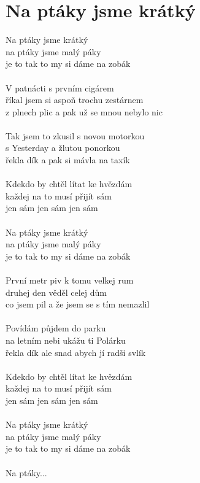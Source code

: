 \section{Na ptáky jsme krátký}
Na ptáky jsme krátký\\
na ptáky jsme malý páky\\
je to tak to my si dáme na zobák\\
\\
V patnácti s prvním cigárem\\
říkal jsem si aspoň trochu zestárnem\\
z plnech plic a pak už se mnou nebylo nic\\
\\
Tak jsem to zkusil s novou motorkou\\
s Yesterday a žlutou ponorkou\\
řekla dík a pak si mávla na taxík\\
\\
Kdekdo by chtěl lítat ke hvězdám\\
každej na to musí přijít sám\\
jen sám jen sám jen sám\\
\\
Na ptáky jsme krátký\\
na ptáky jsme malý páky\\
je to tak to my si dáme na zobák\\
\\
První metr piv k tomu velkej rum\\
druhej den věděl celej dům\\
co jsem pil a že jsem se s tím nemazlil\\
\\
Povídám půjdem do parku\\
na letním nebi ukážu ti Polárku\\
řekla dík ale snad abych jí radši svlík\\
\\
Kdekdo by chtěl lítat ke hvězdám\\
každej na to musí přijít sám\\
jen sám jen sám jen sám\\
\\
Na ptáky jsme krátký\\
na ptáky jsme malý páky\\
je to tak to my si dáme na zobák\\
\\
Na ptáky...\\
